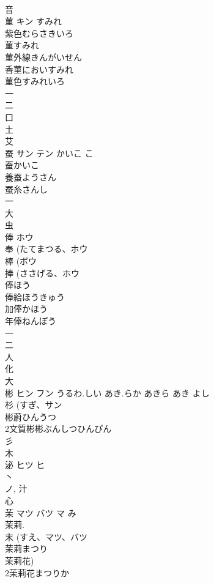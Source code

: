 \documentclass[8pt]{extreport}
\begin{document}
\begin{CJK}{UTF8}{min}
\\	音 
\\	菫	キン	すみれ	
\\	紫色むらさきいろ 
\\	菫すみれ 
\\	菫外線きんがいせん 
\\	香菫においすみれ 
\\	菫色すみれいろ 
\\	一 
\\	二 
\\	口 
\\	土 
\\	艾 
\\	蚕	サン テン	かいこ こ	
\\	蚕かいこ
\\	養蚕ようさん
\\	蚕糸さんし
\\	一 
\\	大 
\\	虫 
\\	俸	ホウ		
\\	奉 (たてまつる、ホウ 
\\	棒 (ボウ 
\\	捧 (ささげる、ホウ 
\\	俸ほう
\\	俸給ほうきゅう
\\	加俸かほう
\\	年俸ねんぽう
\\	一 
\\	二 
\\	人 
\\	化 
\\	大 
\\	彬	ヒン フン	うるわ.しい あき.らか あきら あき よし	
\\	杉 (すぎ、サン 
\\	彬蔚ひんうつ
\\	2文質彬彬ぶんしつひんぴん
\\	彡 
\\	木 
\\	泌	ヒツ ヒ		
\\	丶 
\\	ノ, 汁 
\\	心 
\\	茉	マツ バツ マ	み	
\\	茉莉. 
\\	末 (すえ、マツ、バツ 
\\	茉莉まつり
\\	茉莉花) 
\\	2茉莉花まつりか

\end{CJK}
\end{document}
